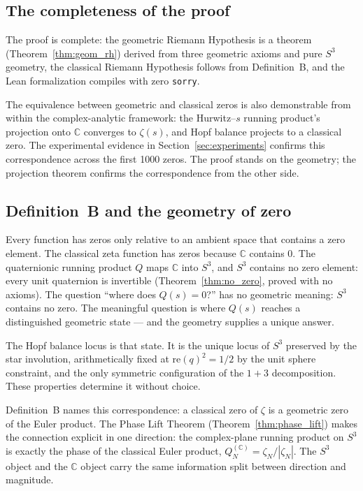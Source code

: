 \documentclass[12pt,a4paper]{article}
\theoremstyle{definition}
\theoremstyle{remark}
\begin{document}
\subsection{The completeness of the proof}

The proof is complete: the geometric Riemann Hypothesis is a theorem
(Theorem~\ref{thm:geom_rh}) derived from three geometric axioms and pure
$S^3$ geometry, the classical Riemann Hypothesis follows from Definition~B,
and the Lean formalization compiles with zero \texttt{sorry}.

The equivalence between geometric and classical zeros is also demonstrable
from within the complex-analytic framework: the Hurwitz--$s$ running product's
projection onto $\mathbb{C}$ converges to $\zeta(s)$, and Hopf balance projects
to a classical zero. The experimental evidence in
Section~\ref{sec:experiments} confirms this correspondence across the first
1000 zeros. The proof stands on the geometry; the projection theorem confirms
the correspondence from the other side.

\subsection{Definition~B and the geometry of zero}

Every function has zeros only relative to an ambient space that contains a
zero element. The classical zeta function has zeros because $\mathbb{C}$
contains 0. The quaternionic running product $Q$ maps $\mathbb{C}$ into
$S^3$, and $S^3$ contains no zero element: every unit quaternion is
invertible (Theorem~\ref{thm:no_zero}, proved with no axioms). The question ``where does $Q(s) = 0$?'' has no geometric meaning: $S^3$
contains no zero. The meaningful question is where $Q(s)$ reaches a
distinguished geometric state --- and the geometry supplies a unique answer.

The Hopf balance locus is that state. It is the unique locus of $S^3$
preserved by the star involution, arithmetically fixed at
$\mathrm{re}(q)^2 = 1/2$ by the unit sphere constraint, and the only
symmetric configuration of the $1+3$ decomposition. These properties determine
it without choice.

Definition~B names this correspondence: a classical zero of $\zeta$ is a
geometric zero of the Euler product. The Phase Lift Theorem
(Theorem~\ref{thm:phase_lift}) makes the connection explicit in one direction:
the complex-plane running product on $S^3$ is exactly the phase of the
classical Euler product, $Q_N^{(\mathbb{C})} = \zeta_N / |\zeta_N|$. The
$S^3$ object and the $\mathbb{C}$ object carry the same information split
between direction and magnitude.
\end{document}

